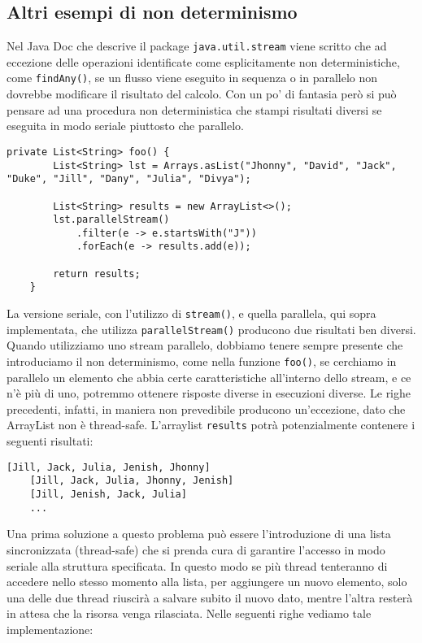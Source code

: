 						
		\subsection{Altri esempi di non determinismo}
			Nel Java Doc che descrive il package \lstinline|java.util.stream| viene scritto che ad eccezione delle operazioni identificate come esplicitamente non deterministiche, come \lstinline|findAny()|, se un flusso viene eseguito in sequenza o in parallelo non dovrebbe modificare il risultato del calcolo. Con un po' di fantasia però si può pensare ad una procedura non deterministica che stampi risultati diversi se eseguita in modo seriale piuttosto che parallelo.
			\begin{lstlisting}[breaklines=true]
	private List<String> foo() {
		List<String> lst = Arrays.asList("Jhonny", "David", "Jack", "Duke", "Jill", "Dany", "Julia", "Divya");
	
		List<String> results = new ArrayList<>();
		lst.parallelStream()
			.filter(e -> e.startsWith("J"))
			.forEach(e -> results.add(e));
			
		return results;
	}
			\end{lstlisting}
			La versione seriale, con l'utilizzo di \lstinline|stream()|, e quella parallela, qui sopra implementata, che utilizza \lstinline|parallelStream()| producono due risultati ben diversi. Quando utilizziamo uno stream parallelo, dobbiamo tenere sempre presente che introduciamo il non determinismo, come nella funzione \lstinline|foo()|, se cerchiamo in parallelo un elemento che abbia certe caratteristiche all'interno dello stream, e ce n'è più di uno, potremmo ottenere risposte diverse in esecuzioni diverse. Le righe precedenti, infatti, in maniera non prevedibile producono un'eccezione, dato che ArrayList non è thread-safe. L'arraylist \lstinline|results| potrà potenzialmente contenere i seguenti risultati:
			\begin{lstlisting}[numbers=none,frame=none]
	[Jill, Jack, Julia, Jenish, Jhonny]
	[Jill, Jack, Julia, Jhonny, Jenish]
	[Jill, Jenish, Jack, Julia]
	...
			\end{lstlisting}
			Una prima soluzione a questo problema può essere l'introduzione di una lista sincronizzata (thread-safe) che si prenda cura di garantire l'accesso in modo seriale alla struttura specificata. In questo modo se più thread tenteranno di accedere nello stesso momento alla lista, per aggiungere un nuovo elemento, solo una delle due thread riuscirà a salvare subito il nuovo dato, mentre l'altra resterà in attesa che la risorsa venga rilasciata. Nelle seguenti righe vediamo tale implementazione:
